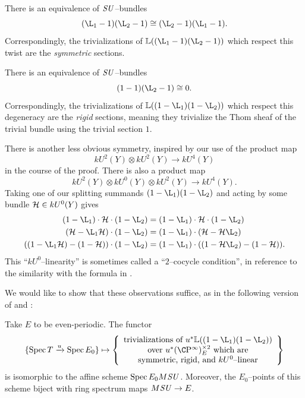 \begin{example}
There is an equivalence of \(\mathit{SU}\)--bundles \[(\L_1 - 1)(\L_2 - 1) \cong (\L_2 - 1)(\L_1 - 1).\]
Correspondingly, the trivializations of \(\ThomSheaf{(\L_1 - 1)(\L_2 - 1)}\) which respect this twist are the \emph{symmetric} sections.
\end{example}

\begin{example}
There is an equivalence of \(\mathit{SU}\)--bundles \[(1 - 1)(\L_2 - 1) \cong 0.\]
Correspondingly, the trivializations of \(\ThomSheaf{(1 - \L_1)(1 - \L_2)}\) which respect this degeneracy are the \emph{rigid} sections, meaning they trivialize the Thom sheaf of the trivial bundle using the trivial section \(1\).
\end{example}

\begin{example}\label{TwoCocycleConditionForBSUBundles}
There is another less obvious symmetry, inspired by our use of the product map \[kU^2(Y) \otimes kU^2(Y) \to kU^4(Y)\] in the course of the proof.
There is also a product map \[kU^2(Y) \otimes kU^0(Y) \otimes kU^2(Y) \to kU^4(Y).\]
Taking one of our splitting summands \((1 - \L_1)(1 - \L_2)\) and acting by some bundle \(\mathcal{H} \in kU^0(Y)\) gives
\begin{align*}
(1 - \L_1) \cdot \sheaf H \cdot (1 - \L_2) & = (1 - \L_1) \cdot \sheaf H \cdot (1 - \L_2) \\
(\sheaf H - \L_1 \sheaf H) \cdot (1 - \L_2) & = (1 - \L_1) \cdot (\sheaf H - \sheaf H \L_2) \\
((1 - \L_1 \sheaf H) - (1 - \sheaf H)) \cdot (1 - \L_2) & = (1 - \L_1) \cdot ((1 - \sheaf H \L_2) - (1 - \sheaf H)).
\end{align*}
This ``\(kU^0\)--linearity'' is sometimes called a ``\(2\)--cocycle condition'', in reference to the similarity with the formula in .
\end{example}

We would like to show that these observations suffice, as in the following version of  and :
\begin{theorem}\label{BSUTriumvirate}
Take \(E\) to be even-periodic.
The functor \[\{\Spec T \xrightarrow{u} \Spec E_0\} \mapsto \left\{ \begin{array}{c} \text{trivializations of \(u^* \ThomSheaf{(1 - \L_1)(1 - \L_2)}\)} \\ \text{over \(u^* (\CP^\infty)^{\times 2}_E\) which are} \\ \text{symmetric, rigid, and \(kU^0\)--linear} \end{array} \right\}\] is isomorphic to the affine scheme \(\operatorname{Spec} E_0 M\mathit{SU}\).
Moreover, the \(E_0\)--points of this scheme biject with ring spectrum maps \(M\mathit{SU} \to E\).
\end{theorem}

